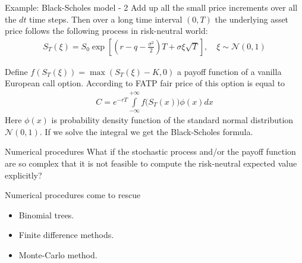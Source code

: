 \documentclass{beamer}
\begin{document}
\begin{frame}{Example: Black-Scholes model - 2}
\justify
Add up all the small price increments over all the $dt$ time steps. Then over a long time interval $(0, T)$ the underlying asset price follows the following process in risk-neutral world:
\begin{align*}
S_T(\xi) = S_0\exp{\left[\left(r - q - \frac{\sigma^2}{2}\right)T + \sigma\xi\sqrt{T}\right]}, \quad \xi \sim \mathcal{N}(0, 1)
\end{align*}

\justify
Define $f(S_T(\xi)) = \max(S_T(\xi) - K, 0)$ a payoff function of a vanilla European call option. According to FATP fair price of this option is equal to
\begin{align*}
C = e^{-rT} \int\limits_{-\infty}^{+\infty}f\Big(S_T(x)\Big)\phi(x)dx
\end{align*}
Here $\phi(x)$ is probability density function of the standard normal distribution $\mathcal{N}(0,1)$. If we solve the integral we get the Black-Scholes formula.
\end{frame}



\begin{frame}{Numerical procedures}
\justify
What if the stochastic process and/or the payoff function are so complex that it is not feasible to compute the risk-neutral expected value explicitly?

\justify
Numerical procedures come to rescue
\begin{itemize}
\item Binomial trees.
\item Finite difference methods.
\item Monte-Carlo method.
\end{itemize}
\end{frame}
\end{document}
